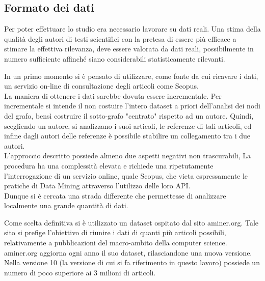 \documentclass[a4paper, 12pt]{article}
\begin{document}
\subsection{Formato dei dati}
Per poter effettuare lo studio era necessario lavorare su dati reali. Una stima della qualità degli autori di testi scientifici con la pretesa di essere più efficace a stimare la effettiva rilevanza, deve essere valorata da dati reali, possibilmente in numero sufficiente affinché siano considerabili statisticamente rilevanti.
\par
In un primo momento si è pensato di utilizzare, come fonte da cui ricavare i dati, un servizio on-line di consultazione degli articoli come Scopus. \\ 
La maniera di ottenere i dati sarebbe dovuta essere incrementale.
Per incrementale si intende il non costuire l'intero dataset a priori dell'analisi dei nodi del grafo, bensì costruire il sotto-grafo "centrato" rispetto ad un autore.
Quindi, scegliendo un autore, si analizzano i suoi articoli, le referenze di tali articoli, ed infine dagli autori delle referenze è possibile stabilire un collegamento tra i due autori. \\
L'approccio descritto possiede almeno due aspetti negativi non trascurabili,
La procedura ha una complessità elevata e richiede una ripetutamente l'interrogazione di un servizio online, quale Scopus, che vieta espressamente le pratiche di Data Mining attraverso l'utilizzo delle loro API. \\
Dunque si è cercata una strada differente che permettesse di analizzare localmente una grande quantità di dati.
\par
Come scelta definitiva si è utilizzato un dataset ospitato dal sito aminer.org. Tale sito si prefige l'obiettivo di riunire i dati di quanti più articoli possibili, relativamente a pubblicazioni del macro-ambito della computer science. \\
aminer.org aggiorna ogni anno il suo dataset, rilasciandone una nuova versione. Nella versione 10 (la versione di cui si fa riferimento in questo lavoro) possiede un numero di poco superiore ai 3 milioni di articoli. \\
\end{document}
